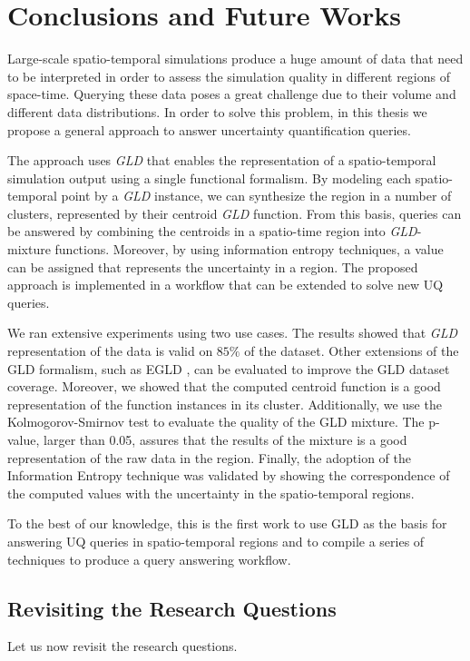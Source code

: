 \chapter[Conclusions and Future Works]{Conclusions and Future Works}\label{cap:conclusions}
Large-scale spatio-temporal simulations produce a huge amount of data that need to be interpreted in order to assess the simulation quality in different regions of space-time. Querying these data poses a great challenge due to their volume and different data distributions. In order to solve this problem, in this thesis we propose a general approach to answer uncertainty quantification queries. 

The approach uses \textit{GLD} that enables the representation of a spatio-temporal simulation output using a single functional formalism. By modeling each spatio-temporal point by a \textit{GLD} instance, we can synthesize the region in a number of clusters, represented by their centroid \textit{GLD} function. From this basis, queries can be answered by combining the centroids in a spatio-time region into \textit{GLD}-mixture functions. Moreover, by using information entropy techniques, a value can be assigned that represents the uncertainty in a region. The proposed approach is implemented in a workflow that can be extended to solve new UQ queries.

We ran extensive experiments using two use cases. The results showed that \textit{GLD} representation of the data is valid on $85 \%$ of the dataset. Other extensions of the GLD formalism, such as EGLD \cite{Karian2011}, can be evaluated to improve the GLD dataset coverage. Moreover, we showed that the computed centroid function is a good representation of the function instances in its cluster. Additionally, we use the Kolmogorov-Smirnov test to evaluate the quality of the GLD mixture. The p-value, larger than 0.05, assures that the results of the mixture is a good representation of the raw data in the region. Finally, the adoption of the Information Entropy technique was validated by showing the correspondence of the computed values with the uncertainty in the spatio-temporal regions. 

To the best of our knowledge, this is the first work to use GLD as the basis for answering UQ queries in spatio-temporal regions and to compile a series of techniques to produce a query answering workflow.

\section{Revisiting the Research Questions}
Let us now revisit the research questions.

